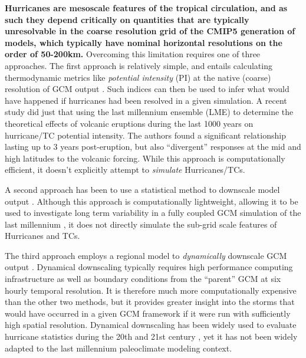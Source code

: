 \documentclass[phd,tocprelim]{cornell}
\begin{document}
\textbf{Hurricanes are mesoscale features of the tropical circulation,
  and as such they depend critically on quantities that are typically
  unresolvable in the coarse resolution grid of the CMIP5 generation
  of models, which typically have nominal horizontal resolutions on
  the order of 50-200km.} Overcoming this limitation requires one of
three approaches. The first approach is relatively simple, and entails
calculating thermodynamic metrics like \textit{potential intensity}
(PI) at the native (coarse) resolution of GCM output
\cite{wang,ke_nolan,tang,bister2002}. Such indices can then be used to infer what
would have happened if hurricanes had been resolved in a given
simulation. A recent study \cite{yan2018divergent} 
did just that using the
last millennium ensemble (LME) to determine the theoretical effects of
volcanic eruptions during the last 1000 years on hurricane/TC
potential intensity. The authors found a significant relationship
lasting up to 3 years post-eruption, but also ``divergent'' responses
at the mid and high latitudes to the volcanic forcing. While this
approach is computationally efficient, it doesn't explicitly attempt
to \textit{simulate} Hurricanes/TCs.

A second approach has been to use a statistical method to downscale
model output \cite{down_method_ke,cam_down_ke}. Although this approach
is computationally lightweight, allowing it to be used to investigate
long term variability in a fully coupled GCM simulation of the last
millennium \cite{lme_down_ke}, it does not directly simulate the
sub-grid scale features of Hurricanes and TCs.

The third approach employs a regional model to \textit{dynamically}
downscale GCM output \cite{down_21st_gv}. Dynamical
downscaling typically requires high performance computing
infrastructure as well as boundary conditions from the ``parent'' GCM
at six hourly temporal resolution. It is therefore much more
computationally expensive than the other two methods, but it provides
greater insight into the storms that would have occurred in a given
GCM framework if it were run with sufficiently high spatial
resolution. Dynamical downscaling has been widely used to evaluate
hurricane statistics during the 20th and 21st century \cite{Emanuel12219}, yet
it has not been widely adapted to the last millennium paleoclimate
modeling context.
\end{document}
